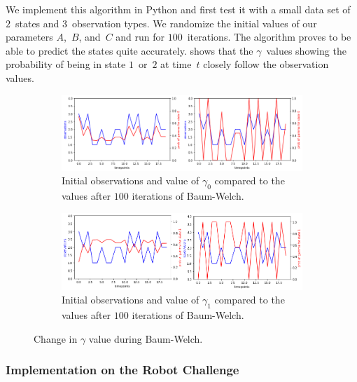 \documentclass[twoside]{article}
\begin{document}
We implement this algorithm in Python and first test it with a small data set of $2$~states and $3$~observation types.
We randomize the initial values of our parameters $A$,~$B$, and~$C$ and run for $100$~iterations.
The algorithm proves to be able to predict the states quite accurately.
 shows that the $\gamma$~values showing the probability of being in state $1$~or~$2$ at time~$t$ closely follow the observation values.
\begin{figure}[h]
  \centering
  \begin{subfigure}[t]{0.9\textwidth}
    \includegraphics[width=\textwidth]{images/small-dataset-top}
    \caption{Initial observations and value of $\gamma_0$ compared to the values after $100$ iterations of Baum-Welch.}\label{fig:small-dataset-top}
  \end{subfigure}
  \begin{subfigure}[t]{0.9\textwidth}
    \includegraphics[width=\textwidth]{images/small-dataset-bottom}
    \caption{Initial observations and value of $\gamma_1$ compared to the values after $100$ iterations of Baum-Welch.}\label{fig:small-dataset-bottom}
  \end{subfigure}
  \caption[bw-gamma]{Change in $\gamma$ value during Baum-Welch.}
  \label{fig:bw-gamma}
\end{figure}

\subsubsection{Implementation on the Robot Challenge}\label{sec:impl-robot-challenge}
\end{document}
